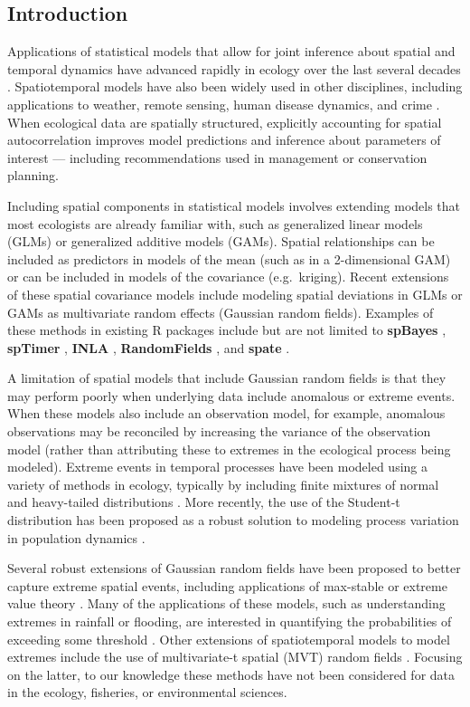 \documentclass[12pt,english]{article}
\begin{document}
\begin{spacing}{1.5}
\section{Introduction}

Applications of statistical models that allow for joint inference about spatial
and temporal dynamics have advanced rapidly in ecology over the last several
decades \citep{bascompte1995, latimer2009}. Spatiotemporal models have also
been widely used in other disciplines, including applications to weather,
remote sensing, human disease dynamics, and crime \citep{cressie2011}. When
ecological data are spatially structured, explicitly accounting for spatial
autocorrelation improves model predictions and inference about parameters of
interest --- including recommendations used in management or conservation planning.

Including spatial components in statistical models involves extending models
that most ecologists are already familiar with, such as generalized linear
models (GLMs) or generalized additive models (GAMs). Spatial relationships can
be included as predictors in models of the mean (such as in a 2-dimensional
GAM) or can be included in models of the covariance (e.g.\ kriging). Recent
extensions of these spatial covariance models include modeling spatial
deviations in GLMs or GAMs as multivariate random effects (Gaussian random
fields). Examples of these methods in existing R packages include but are
not limited to \textbf{spBayes} \citep{finley2007}, \textbf{spTimer}
\citep{bakar2015}, \textbf{INLA} \citep{rue2009}, \textbf{RandomFields}
\citep{schlather2016}, and \textbf{spate} \citep{sigrist2015}.

A limitation of spatial models that include Gaussian random fields is that
they may perform poorly when underlying data include anomalous or extreme events.
When these models also include an observation model, for example, anomalous
observations may be reconciled by increasing the variance of the observation
model (rather than attributing these to extremes in the ecological process being
modeled). Extreme events in temporal processes have been modeled using a variety
of methods in ecology, typically by including finite mixtures of normal and
heavy-tailed distributions \citep{everitt1996, ward2007, thorson2011}. More
recently, the use of the Student-t distribution has been proposed as a robust
solution to modeling process variation in population dynamics \citep{anderson2017}.

Several robust extensions of Gaussian random fields have been proposed to
better capture extreme spatial events, including applications of max-stable or
extreme value theory \citep{davison2012, davison2012a}. Many of the
applications of these models, such as understanding extremes in rainfall or
flooding, are interested in quantifying the probabilities of exceeding some
threshold \citep{davis2008}. Other extensions of spatiotemporal models to model
extremes include the use of multivariate-t spatial (MVT) random fields
\citep{roislien2007}. Focusing on the latter, to our knowledge these methods
have not been considered for data in the ecology, fisheries, or environmental
sciences.


\end{spacing}
\end{document}
